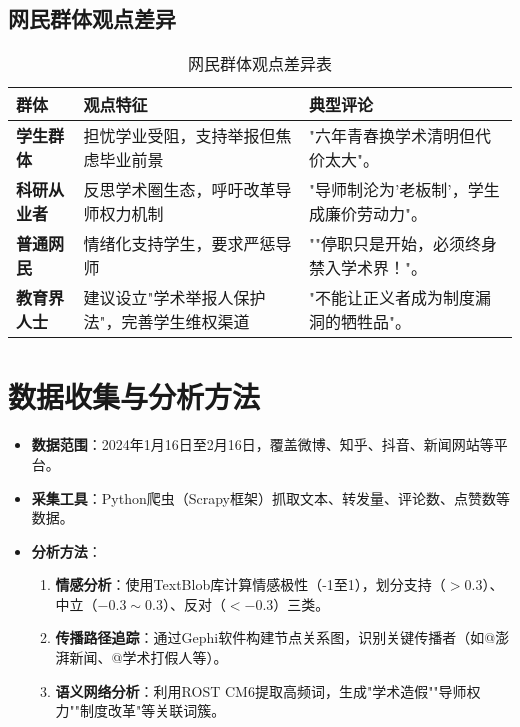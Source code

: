 \documentclass[12pt,a4paper]{article}
\begin{document}
\subsection{网民群体观点差异}
\begin{table}[H]
    \centering
    \begin{tabular}{|p{3cm}|p{6cm}|p{6cm}|}
        \hline
        \textbf{群体} & \textbf{观点特征} & \textbf{典型评论} \\
        \hline
        \textbf{学生群体} & 担忧学业受阻，支持举报但焦虑毕业前景 & "六年青春换学术清明但代价太大"。\\ 
        \hline
        \textbf{科研从业者} & 反思学术圈生态，呼吁改革导师权力机制 &  "导师制沦为'老板制'，学生成廉价劳动力"。 \\
        \hline
        \textbf{普通网民} & 情绪化支持学生，要求严惩导师 & ""停职只是开始，必须终身禁入学术界！"。\\ 
        \hline
        \textbf{教育界人士} & 建议设立"学术举报人保护法"，完善学生维权渠道 & "不能让正义者成为制度漏洞的牺牲品"。 \\
        \hline
    \end{tabular}
    \caption{网民群体观点差异表}
\end{table}

\section{数据收集与分析方法}
\begin{itemize}[leftmargin=*]
    \item \textbf{数据范围}：2024年1月16日至2月16日，覆盖微博、知乎、抖音、新闻网站等平台。
    \item \textbf{采集工具}：Python爬虫（Scrapy框架）抓取文本、转发量、评论数、点赞数等数据。
    \item \textbf{分析方法}：
    \begin{enumerate}
        \item \textbf{情感分析}：使用TextBlob库计算情感极性（-1至1），划分支持（$>0.3$）、中立（$-0.3\sim0.3$）、反对（$<-0.3$）三类。
        \item \textbf{传播路径追踪}：通过Gephi软件构建节点关系图，识别关键传播者（如@澎湃新闻、@学术打假人等）。
        \item \textbf{语义网络分析}：利用ROST CM6提取高频词，生成"学术造假""导师权力""制度改革"等关联词簇。
    \end{enumerate}
\end{itemize}
\end{document}
